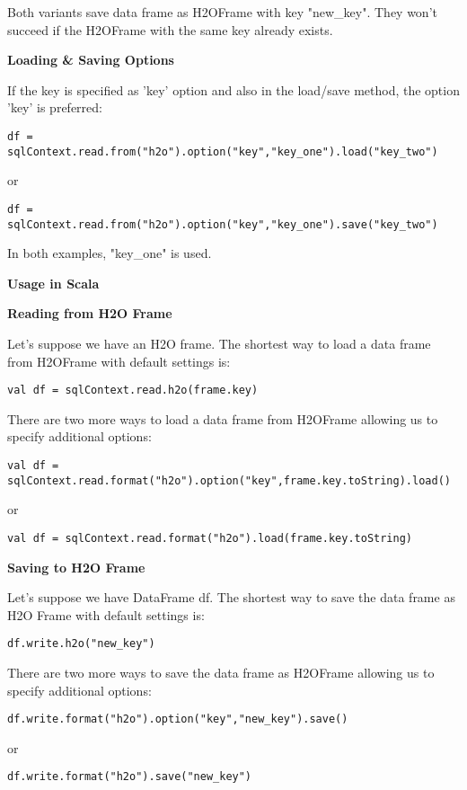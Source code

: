 Both variants save data frame as H2OFrame with key "new\_key". They won't succeed if the H2OFrame with the same key already exists.

\textbf{Loading \& Saving Options}

If the key is specified as 'key' option and also in the load/save method, the option 'key' is preferred:
\begin{lstlisting}[style=Scala]
df = sqlContext.read.from("h2o").option("key","key_one").load("key_two")
\end{lstlisting}
or
\begin{lstlisting}[style=Scala]
df = sqlContext.read.from("h2o").option("key","key_one").save("key_two")
\end{lstlisting}

In both examples, "key\_one" is used.

\textbf{Usage in Scala}

\textbf{Reading from H2O Frame}

Let's suppose we have an H2O frame. The shortest way to load a data frame from H2OFrame with default settings is:
\begin{lstlisting}[style=Scala]
val df = sqlContext.read.h2o(frame.key)
\end{lstlisting}

There are two more ways to load a data frame from H2OFrame allowing us to specify additional options:
\begin{lstlisting}[style=Scala]
val df = sqlContext.read.format("h2o").option("key",frame.key.toString).load()
\end{lstlisting}
or
\begin{lstlisting}[style=Scala]
val df = sqlContext.read.format("h2o").load(frame.key.toString)
\end{lstlisting}

\textbf{Saving to H2O Frame}

Let's suppose we have DataFrame df. The shortest way to save the data frame as H2O Frame with default settings is:
\begin{lstlisting}[style=Scala]
df.write.h2o("new_key")
\end{lstlisting}

There are two more ways to save the data frame as H2OFrame allowing us to specify additional options:
\begin{lstlisting}[style=Scala]
df.write.format("h2o").option("key","new_key").save()
\end{lstlisting}
or
\begin{lstlisting}[style=Scala]
df.write.format("h2o").save("new_key")
\end{lstlisting}

